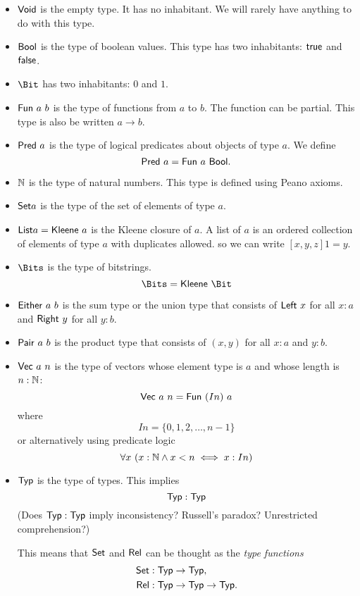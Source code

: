 \begin{itemize}
    \item
        $\mathsf{Void}$ is the empty type.
        It has no inhabitant.
        We will rarely have anything to do with this type.
    \item
        $\textsf{Bool}$ is the type of boolean values.
        This type has two inhabitants: $\textsf{true}$ and $\textsf{false}$.
    \item
        $\Bit$ has two inhabitants: $0$ and $1$.
    \item
        $\mathsf{Fun}~a~b$ is the type of functions from $a$ to $b$.
        The function can be partial.
        This type is also be written $a \to b$.
    \item
        $\mathsf{Pred}~a$ is the type of
        logical predicates about objects of type $a$.
        We define
        \[ \mathsf{Pred}~a = \mathsf{Fun}~a~\textsf{Bool}. \]
    \item
        $\mathbb{N}$ is the type of natural numbers.
        This type is defined using Peano axioms.
    \item
        $\textsf{Set}{a}$ is the type of the set of elements of type $a$.
    \item $\textsf{List}{a} = \mathsf{Kleene}~a$ is the Kleene closure of $a$.
        A list of $a$ is an ordered collection of elements of type $a$ with duplicates allowed.
        so we can write $[x,y,z] 1 = y$.
    \item $\Bits$ is the type of bitstrings.
        \[
            \Bits = \Kleene{\Bit}
        \]
    \item $\mathsf{Either}~a~b$ is the sum type or the union type
        that consists of $\mathsf{Left}~x$ for all $x : a$
        and $\mathsf{Right}~y$ for all $y : b$.
    \item $\mathsf{Pair}~a~b$ is the product type
        that consists of $(x,y)$ for all $x : a$ and $y : b$.
    \item
        $\mathsf{Vec}~a~n$ is the type of vectors
        whose element type is $a$ and whose length is $n : \mathbb{N}$:
        \[ \mathsf{Vec}~a~n = \mathsf{Fun}~(I n)~a \]
        where
        \[ I n = \{ 0, 1, 2, \ldots, n - 1 \} \]
        or alternatively using predicate logic
        \[ \forall x~ (x : \mathbb{N} \wedge x < n \iff x : I n) \]
    \item $\mathsf{Typ}$ is the type of types.
        This implies
        \[ \mathsf{Typ} : \mathsf{Typ} \]
        (Does $\mathsf{Typ} : \mathsf{Typ}$ imply inconsistency?
        Russell's paradox?
        Unrestricted comprehension?)

        This means that $\mathsf{Set}$ and $\mathsf{Rel}$ can be thought as the \emph{type functions}
        \begin{align*}
            \mathsf{Set} &: \mathsf{Typ} \to \mathsf{Typ},
            \\
            \mathsf{Rel} &: \mathsf{Typ} \to \mathsf{Typ} \to \mathsf{Typ}.
        \end{align*}
\end{itemize}

